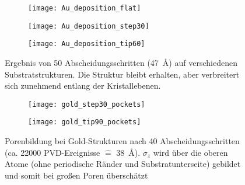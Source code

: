 \begin{figure}[p]
  \captionsetup[subfigure]{singlelinecheck=false}
  \def\subfigwidth{0.31\textwidth}
  \begin{subfigure}[t]{\subfigwidth}
    \texttt{[image: Au\_deposition\_flat]}
    \label{fig:golddepositions-a}
  \end{subfigure}
  \hfill
  \begin{subfigure}[t]{\subfigwidth}
    \texttt{[image: Au\_deposition\_step30]}
    \label{fig:golddepositions-b}
  \end{subfigure}
  \hfill
  \begin{subfigure}[t]{\subfigwidth}
    \texttt{[image: Au\_deposition\_tip60]}
    \label{fig:golddepositions-c}
  \end{subfigure}
  \caption[Abscheidung auf strukturierten Substraten]{
    Ergebnis von 50 Abscheidungsschritten (\SI{47}{\angstrom}) auf verschiedenen Substratstrukturen.
    Die Struktur bleibt erhalten, aber verbreitert sich zunehmend entlang der Kristallebenen.
  }
  \label{fig:golddepositions}
\end{figure}

\begin{figure}[p]
  \captionsetup[subfigure]{singlelinecheck=false}
  \def\subfigwidth{0.49\textwidth}

  \begin{subfigure}[t]{\subfigwidth}
    \texttt{[image: gold\_step30\_pockets]}
    \label{fig:goldpockets-a}
  \end{subfigure}
  \hfill
  \begin{subfigure}[t]{\subfigwidth}
    \texttt{[image: gold\_tip90\_pockets]}
    \label{fig:goldpockets-b}
  \end{subfigure}

  \caption[Porenbildung bei Gold-Strukturen]{Porenbildung bei Gold-Strukturen nach 40 Abscheidungsschritten (ca. \num{22000} PVD-Ereignisse $\hat{=}$ \SI{38}{\angstrom}). $\sigma_z$ wird über die oberen Atome (ohne periodische Ränder und Substratunterseite) gebildet und somit bei großen Poren überschätzt}
  \label{fig:goldpockets}

\end{figure}

